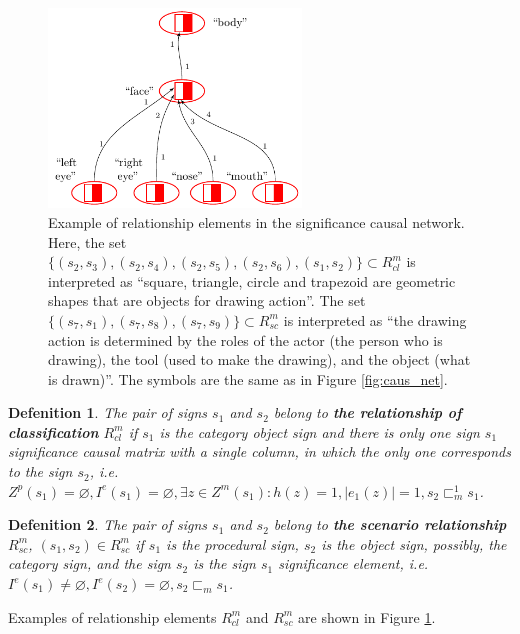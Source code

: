 \documentclass[review]{elsarticle}
\newtheorem{definition}{Defenition}
\begin{document}
\begin{figure}[H]
	\centering
	\includegraphics[width=0.6\textwidth,page=2]{examples/causnet/en/caus_net_colored_en}
	\caption{Example of relationship elements in the significance causal network. Here, the set $\{(s_2,s_3),(s_2,s_4),(s_2,s_5),(s_2,s_6),(s_1,s_2)\}\subset R_{cl}^m$ is interpreted as ``square, triangle, circle and trapezoid are geometric shapes that are objects for drawing action''. The set $\{(s_7,s_1),(s_7,s_8),(s_7,s_9)\}\subset R_{sc}^m$ is interpreted as ``the drawing action is determined by the roles of the actor (the person who is drawing), the tool (used to make the drawing), and the object (what is drawn)''. The symbols are the same as in Figure \ref{fig:caus_net}.}
	\label{fig:signif_relat}		
\end{figure}

\begin{definition}
	The pair of signs $s_1$ and $s_2$ belong to \textbf{the relationship of classification} $R_{cl}^m$ if $s_1$ is the category object sign and there is only one sign $s_1$ significance causal matrix with a single column, in which the only one corresponds to the sign $s_2$, i.e. $Z^p(s_1)=\varnothing, I^e(s_1)=\varnothing, \exists z\in Z^m(s_1): h(z)=1, |e_1(z)|=1, s_2\sqsubset_m^1 s_1$.
\end{definition}

\begin{definition}
	The pair of signs $s_1$ and $s_2$ belong to \textbf{the scenario relationship} $R_{sc}^m$, $(s_1,s_2)\in R_{sc}^m$ if $s_1$ is the procedural sign, $s_2$ is the object sign, possibly, the category sign, and the sign $s_2$ is the sign $s_1$ significance element, i.e. $I^e(s_1)\not = \varnothing, I^e(s_2) = \varnothing, s_2\sqsubset_m s_1$.
\end{definition}

Examples of relationship elements $R_{cl}^m$ and $R_{sc}^m$ are shown in Figure \ref{fig:signif_relat}.
\end{document}
